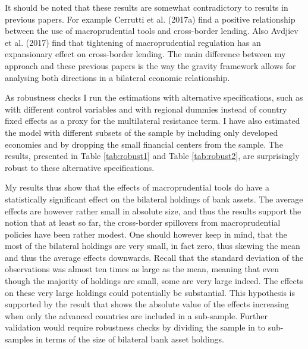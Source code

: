 \documentclass[12pt,a4paper]{article}
\begin{document}
It should be noted that these results are somewhat contradictory to results in previous papers. For example Cerrutti et al. (2017a) find a positive relationship between the use of macroprudential tools and cross-border lending. Also Avdjiev et al. (2017) find that tightening of macroprudential regulation has an expansionary effect on cross-border lending. The main difference between my approach and these previous papers is the way the gravity framework allows for analysing both directions in a bilateral economic relationship.  

As robustness checks I run the estimations with alternative specifications, such as with different control variables and with regional dummies instead of country fixed effects as a proxy for the multilateral resistance term. I have also estimated the model with different subsets of the sample by including only developed economies and by dropping the small financial centers from the sample. The results, presented in Table \ref{tab:robust1} and Table \ref{tab:robust2}, are surprisingly robust to these alternative specifications. 

My results thus show that the effects of macroprudential tools do have a statistically significant effect on the bilateral holdings of bank assets. The average effects are however rather small in absolute size, and thus the results support the notion that at least so far, the cross-border spillovers from macroprudential policies have been rather modest. One should however keep in mind, that the most of the bilateral holdings are very small, in fact zero, thus skewing the mean and thus the average effects downwards. Recall that the standard deviation of the observations was almost ten times as large as the mean, meaning that even though the majority of holdings are small, some are very large indeed. The effects on these very large holdings could potentially be substantial. This hypothesis is supported by the result that shows the absolute value of the effects increasing when only the advanced countries are included in a sub-sample. Further validation would require robustness checks by dividing the sample in to sub-samples in terms of the size of bilateral bank asset holdings.
\end{document}
